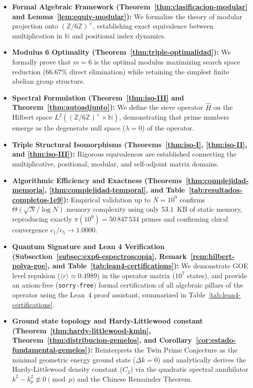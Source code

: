 \documentclass{article}
\numberwithin{equation}{section}
\theoremstyle{plain}
\theoremstyle{definition}
\begin{document}
\begin{itemize}
    \item \textbf{Formal Algebraic Framework (Theorem~\ref{thm:clasificacion-modular} and Lemma~\ref{lem:equiv-modular}):} We formalize the theory of modular projection onto $(\mathbb{Z}/6\mathbb{Z})^\times$, establishing exact equivalence between multiplication in $\mathbb{N}$ and positional index dynamics.
    \item \textbf{Modulus 6 Optimality (Theorem~\ref{thm:triple-optimalidad}):} We formally prove that $m=6$ is the optimal modulus maximizing search space reduction ($66.67\%$ direct elimination) while retaining the simplest finite abelian group structure.
    \item \textbf{Spectral Formulation (Theorem~\ref{thm:iso-III} and Theorem~\ref{thm:autoadjunto}):} We define the sieve operator $\hat{H}$ on the Hilbert space $L^2((\mathbb{Z}/6\mathbb{Z})^\times \times \mathbb{N})$, demonstrating that prime numbers emerge as the degenerate null space ($\lambda = 0$) of the operator.
    \item \textbf{Triple Structural Isomorphisms (Theorems~\ref{thm:iso-I}, \ref{thm:iso-II}, and \ref{thm:iso-III}):} Rigorous equivalences are established connecting the multiplicative, positional, modular, and self-adjoint matrix domains.
    \item \textbf{Algorithmic Efficiency and Exactness (Theorems~\ref{thm:complejidad-memoria}, \ref{thm:complejidad-temporal}, and Table~\ref{tab:resultados-completos-1e9}):} Empirical validation up to $N=10^9$ confirms $\Theta(\sqrt{N}/\log N)$ memory complexity using only $53.1$~KB of static memory, reproducing exactly $\pi(10^9)=50\,847\,534$ primes and confirming chiral convergence $c_1/c_5 \to 1.0000$.
    \item \textbf{Quantum Signature and Lean 4 Verification (Subsection~\ref{subsec:exp6-espectroscopia}, Remark~\ref{rem:hilbert-polya-goe}, and Table~\ref{tab:lean4-certifications}):} We demonstrate GOE level repulsion ($\langle r \rangle \approx 0.4989$) in the operator matrix ($10^7$ states), and provide an axiom-free (\texttt{sorry-free}) formal certification of all algebraic pillars of the operator using the Lean~4\cite{Lean4} proof assistant, summarized in Table~\ref{tab:lean4-certifications}.
    \item \textbf{Ground state topology and Hardy-Littlewood constant (Theorem~\ref{thm:hardy-littlewood-kmin}, Theorem~\ref{thm:distribucion-gemelos}, and Corollary~\ref{cor:estado-fundamental-gemelos}):} Reinterprets the Twin Prime Conjecture as the minimal geometric energy ground state ($\Delta k = 0$) and analytically derives the Hardy-Littlewood density constant ($C_2$) via the quadratic spectral annihilator $k^2 - k_p^2 \not\equiv 0 \pmod p$ and the Chinese Remainder Theorem.
\end{itemize}
\end{document}
